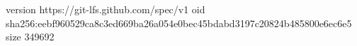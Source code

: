 version https://git-lfs.github.com/spec/v1
oid sha256:eebf960529ca8c3ed669ba26a054e0bec45bdabd3197c20824b485800e6ec6e5
size 349692
